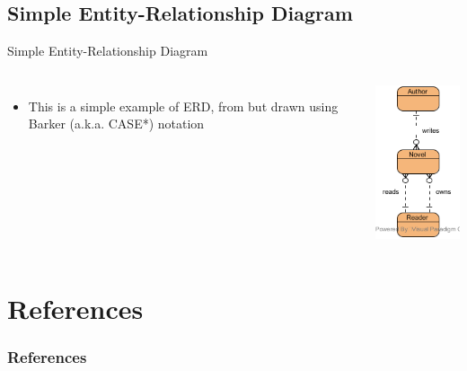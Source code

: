 \documentclass{beamer}
\begin{document}
	\subsection{Simple Entity-Relationship Diagram}
	\begin{frame}{Simple Entity-Relationship Diagram}
		\begin{columns}[t,totalwidth=\textwidth]
				\begin{itemize}
					\item This is a simple example of ERD, from \cite{Schach:2006:OCS:1207045} but drawn using Barker (a.k.a. CASE*) notation \cite{barker1992case} 
				\end{itemize}
				\begin{flushright}
					\includegraphics[scale=0.7]{img/02_simple_erd}
				\end{flushright}
		\end{columns}
	\end{frame}
	
	\section{References}
	\begin{frame}[allowframebreaks]
	        \frametitle{References}
	        
	        
	\end{frame}	
\end{document}
